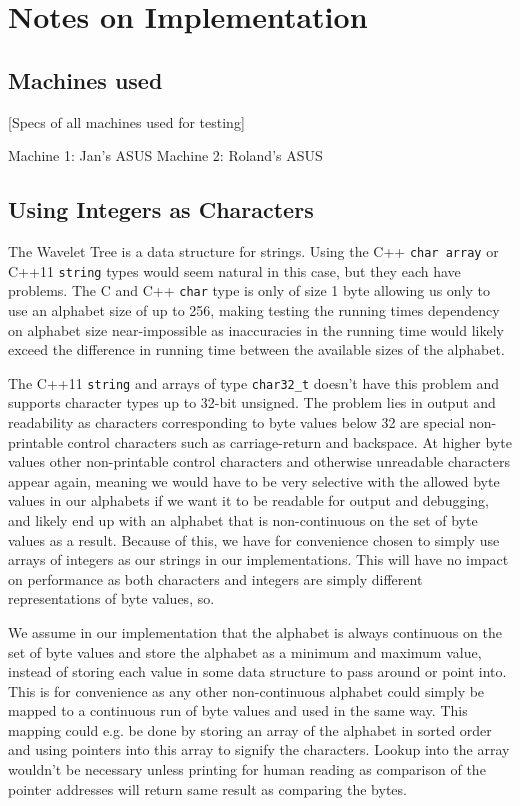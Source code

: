 \section{Notes on Implementation}

\subsection{Machines used}
[Specs of all machines used for testing]

Machine 1: Jan's ASUS
Machine 2: Roland's ASUS

\subsection{Using Integers as Characters}
\label{sec:UsingIntAsChar}
The Wavelet Tree is a data structure for strings. 
Using the C++ \texttt{char array} or C++11 \texttt{string} types would seem natural in this case, but they each have problems.
The C and C++ \texttt{char} type is only of size 1 byte allowing us only to use an alphabet size of up to 256, making testing the running times dependency on alphabet size near-impossible as inaccuracies in the running time would likely exceed the difference in running time between the available sizes of the alphabet.

The C++11 \texttt{string} and arrays of type \texttt{char32\_t} doesn't have this problem and supports character types up to 32-bit unsigned. 
The problem lies in output and readability as characters corresponding to byte values below 32 are special non-printable control characters such as carriage-return and backspace. 
At higher byte values other non-printable control characters and otherwise unreadable characters appear again, meaning we would have to be very selective with the allowed byte values in our alphabets if we want it to be readable for output and debugging, and likely end up with an alphabet that is non-continuous on the set of byte values as a result.
Because of this, we have for convenience chosen to simply use arrays of integers as our strings in our implementations.
This will have no impact on performance as both characters and integers are simply different representations of byte values, so.

We assume in our implementation that the alphabet is always continuous on the set of byte values and store the alphabet as a minimum and maximum value, instead of storing each value in some data structure to pass around or point into.
This is for convenience as any other non-continuous alphabet could simply be mapped to a continuous run of byte values and used in the same way. 
This mapping could e.g. be done by storing an array of the alphabet in sorted order and using pointers into this array to signify the characters. 
Lookup into the array wouldn't be necessary unless printing for human reading as comparison of the pointer addresses will return same result as comparing the bytes.


